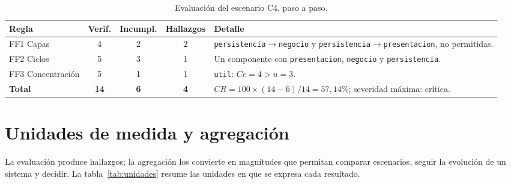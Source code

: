 \begin{table}[H]
\centering
\caption{Evaluación del escenario C4, paso a paso.}
\label{tab:ejemplo}
\footnotesize
\begin{tabularx}{\textwidth}{p{2.6cm}cccX}
\toprule
\textbf{Regla} & \textbf{Verif.} & \textbf{Incumpl.} & \textbf{Hallazgos} & \textbf{Detalle} \\
\midrule
FF1 Capas & 4 & 2 & 2 & \texttt{persistencia}$\rightarrow$\texttt{negocio} y \texttt{persistencia}$\rightarrow$\texttt{presentacion}, no permitidas. \\
FF2 Ciclos & 5 & 3 & 1 & Un componente con \texttt{presentacion}, \texttt{negocio} y \texttt{persistencia}. \\
FF3 Concentración & 5 & 1 & 1 & \texttt{util}: $Ce = 4 > u = 3$. \\
\midrule
\textbf{Total} & \textbf{14} & \textbf{6} & \textbf{4} & $CR = 100 \times (14 - 6) / 14 = 57{,}14\%$; severidad máxima: crítica. \\
\bottomrule
\end{tabularx}
\end{table}

\section{Unidades de medida y agregación}
\label{sec:operacionalizacion}
La evaluación produce hallazgos; la agregación los convierte en magnitudes que permitan comparar escenarios, seguir la evolución de un sistema y decidir. La tabla~\ref{tab:unidades} resume las unidades en que se expresa cada resultado.

